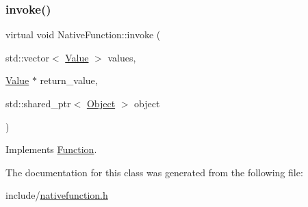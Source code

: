 \subsubsection{\texorpdfstring{invoke()}{invoke()}}
{\footnotesize\ttfamily virtual void Native\+Function\+::invoke (\begin{DoxyParamCaption}\item[{std\+::vector$<$ \hyperlink{classValue}{Value} $>$}]{values,  }\item[{\hyperlink{classValue}{Value} $\ast$}]{return\+\_\+value,  }\item[{std\+::shared\+\_\+ptr$<$ \hyperlink{classObject}{Object} $>$}]{object }\end{DoxyParamCaption})\hspace{0.3cm}{\ttfamily [virtual]}}



Implements \hyperlink{classFunction_a84f9a63e68becc27e58ea738ba4cd698}{Function}.



The documentation for this class was generated from the following file\+:\begin{DoxyCompactItemize}
\item 
include/\hyperlink{nativefunction_8h}{nativefunction.\+h}\end{DoxyCompactItemize}
